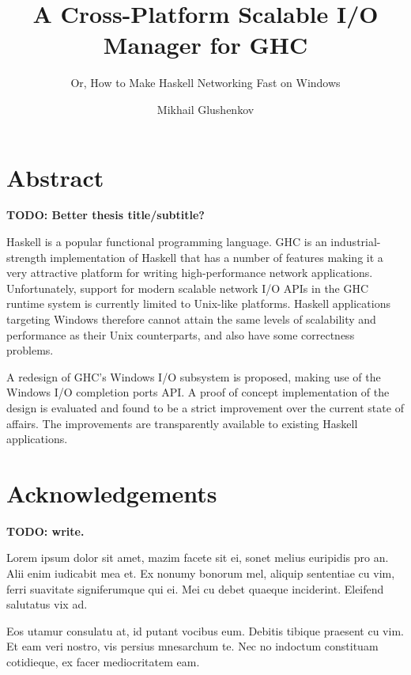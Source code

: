 \documentclass[a4paper,11pt,oneside]{report}
\title{A Cross-Platform Scalable I/O Manager for GHC}
\subtitle{Or, How to Make Haskell Networking Fast on Windows}
\author{Mikhail Glushenkov}
\begin{document}
\maketitle

\chapter*{Abstract}

\textbf{TODO: Better thesis title/subtitle?}

Haskell is a popular functional programming language. GHC is an
industrial-strength implementation of Haskell that has a number of features
making it a very attractive platform for writing high-performance network
applications. Unfortunately, support for modern scalable network I/O APIs in the
GHC runtime system is currently limited to Unix-like platforms. Haskell
applications targeting Windows therefore cannot attain the same levels of
scalability and performance as their Unix counterparts, and also have some
correctness problems.

A redesign of GHC's Windows I/O subsystem is proposed, making use of the Windows
I/O completion ports API. A proof of concept implementation of the design is
evaluated and found to be a strict improvement over the current state of
affairs. The improvements are transparently available to existing Haskell
applications.

\pagebreak

\chapter*{Acknowledgements}

\textbf{TODO: write.}


Lorem ipsum dolor sit amet, mazim facete sit ei, sonet melius euripidis pro
an. Alii enim iudicabit mea et. Ex nonumy bonorum mel, aliquip sententiae cu
vim, ferri suavitate signiferumque qui ei. Mei cu debet quaeque
inciderint. Eleifend salutatus vix ad.

Eos utamur consulatu at, id putant vocibus eum. Debitis tibique praesent cu
vim. Et eam veri nostro, vis persius mnesarchum te. Nec no indoctum constituam
cotidieque, ex facer mediocritatem eam.

\pagebreak


\tableofcontents

\pagebreak

\pagestyle{fancy}
\setcounter{page}{1}
\setcounter{chapter}{-1}
\end{document}
